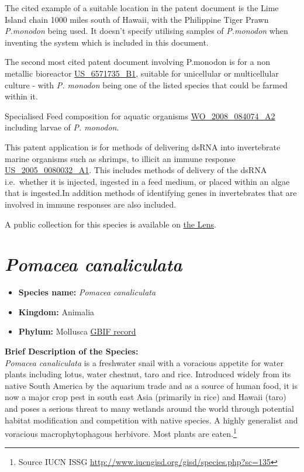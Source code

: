 \documentclass[]{book}
\providecommand{\tightlist}{%
  \setlength{\itemsep}{0pt}\setlength{\parskip}{0pt}}
\theoremstyle{definition}
\theoremstyle{definition}
\theoremstyle{definition}
\theoremstyle{remark}
\begin{document}
The cited example of a suitable location in the patent document is the
Lime Island chain 1000 miles south of Hawaii, with the Philippine Tiger
Prawn \emph{P.monodon} being used. It doesn't specify utilising samples
of \emph{P.monodon} when inventing the system which is included in this
document.

The second most cited patent document involving P.monodon is for a non
metallic bioreactor
\href{https://www.lens.org/lens/patent/US_6571735_B1}{US\_6571735\_B1},
suitable for unicellular or multicellular culture - with \emph{P.
monodon} being one of the listed species that could be farmed within it.

Specialised Feed composition for aquatic organisms
\href{https://www.lens.org/lens/patent/WO_2008_084074_A2}{WO\_2008\_084074\_A2}
including larvae of \emph{P. monodon}.

This patent application is for methods of delivering dsRNA into
invertebrate marine organisms such as shrimps, to illicit an immune
response
\href{https://www.lens.org/lens/patent/US_2005_0080032_A1}{US\_2005\_0080032\_A1}.
This includes methods of delivery of the dsRNA i.e.~whether it is
injected, ingested in a feed medium, or placed within an algae that is
ingested.In addition methods of identifying genes in invertebrates that
are involved in immune responses are also included.

A public collection for this species is available on
\href{https://www.lens.org/lens/collection/24679}{the Lens}.

\hypertarget{pomacea-canaliculata}{%
\section{\texorpdfstring{\emph{Pomacea
canaliculata}}{Pomacea canaliculata}}\label{pomacea-canaliculata}}

\begin{itemize}
\tightlist
\item
  \textbf{Species name:} \emph{Pomacea canaliculata}
\item
  \textbf{Kingdom:} Animalia
\item
  \textbf{Phylum:} Mollusca
  \href{https://www.gbif.org/species/2292582}{GBIF record}
\end{itemize}

\textbf{Brief Description of the Species:}\\
\emph{Pomacea canaliculata} is a freshwater snail with a voracious
appetite for water plants including lotus, water chestnut, taro and
rice. Introduced widely from its native South America by the aquarium
trade and as a source of human food, it is now a major crop pest in
south east Asia (primarily in rice) and Hawaii (taro) and poses a
serious threat to many wetlands around the world through potential
habitat modification and competition with native species. A highly
generalist and voracious macrophytophagous herbivore. Most plants are
eaten.\footnote{Source IUCN ISSG
  \url{http://www.iucngisd.org/gisd/species.php?sc=135}}
\end{document}
